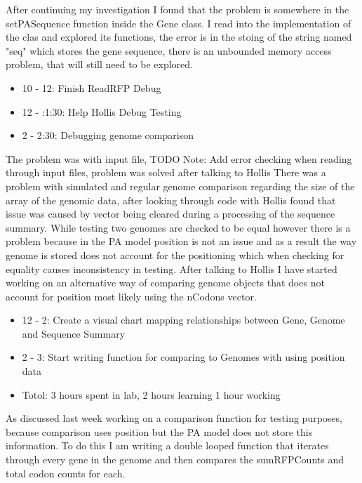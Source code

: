\documentclass[12pt,hyperref]{labbook}
\begin{document}
After continuing my investigation I found that the problem is somewhere in the setPASequence function inside the Gene class. I read into the implementation of the clas and explored its functions, the error is in the stoing of the string named "seq" which stores the gene sequence, there is an unbounded memory access problem, that will still need to be explored.
\begin{itemize}
    \item 10 - 12: Finish ReadRFP Debug
    \item 12 - :1:30: Help Hollis Debug Testing
    \item 2 - 2:30: Debugging genome comparison
\end{itemize}
The problem was with input file, TODO Note: Add error checking when reading through input files, problem was solved after talking to Hollis
There was a problem with simulated and regular genome comparison regarding the size of the array of the genomic data, after looking through code with Hollis found that issue was caused by vector being cleared during a processing of the sequence summary.
While testing two genomes are checked to be equal however there is a problem because in the PA model position is not an issue and as a result the way genome is stored does not account for the positioning which when checking for equality causes inconsistency in testing. After talking to Hollis I have started working on an alternative way of comparing genome objects that does not account for position most likely using the nCodons vector.
\begin{itemize}
    \item 12 - 2: Create a visual chart mapping relationships between Gene, Genome and Sequence Summary
    \item 2 - 3: Start writing function for comparing to Genomes with using position data
    \item Totol: 3 hours spent in lab, 2 hours learning 1 hour working
\end{itemize}
As discussed last week working on a comparison function for testing purposes, because comparison uses position but the PA model does not store this information. To do this I am writing a double looped function that iterates through every gene in the genome and then compares the sumRFPCounts and total codon counts for each.
\end{document}
